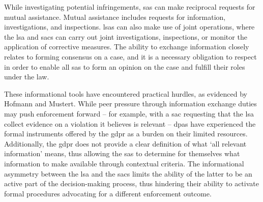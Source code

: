 While investigating potential infringements, \glspl{sa} can make reciprocal requests for mutual assistance.\autocite[60(2), 61(1)]{GDPR} 
Mutual assistance includes requests for information, investigations, and inspections.\autocite[61(1)]{GDPR}
\glspl{lsa} can also make use of joint operations, where the \gls{lsa} and \glspl{sac} can carry out joint investigations, inspections, or monitor the application of corrective measures.\autocite[60(2), 62]{GDPR}
The ability to exchange information closely relates to forming consensus on a case, and it is a necessary obligation to respect in order to enable all \glspl{sa} to form an opinion on the case and fulfill their roles under the law.\autocite[44--45]{edpbGuidelines022022}

These informational tools have encountered practical hurdles, as evidenced by Hofmann and Mustert.\autocite[465--467]{hofmannmustertScholtenHandbook2023}
While peer pressure through information exchange duties may push enforcement forward -- for example, with a \gls{sac} requesting that the \gls{lsa} collect evidence on a violation it believes is relevant -- \glspl{dpa} have experienced the formal instruments offered by the \gls{gdpr} as a burden on their limited resources.\autocite[466]{hofmannmustertScholtenHandbook2023}
Additionally, the \gls{gdpr} does not provide a clear definition of what `all relevant information' means, thus allowing the \glspl{sa} to determine for themselves what information to make available through contextual criteria.\autocite[466]{hofmannmustertScholtenHandbook2023}
The informational asymmetry between the \gls{lsa} and the \glspl{sac} limits the ability of the latter to be an active part of the decision-making process, thus hindering their ability to activate formal procedures advocating for a different enforcement outcome.\autocite[466--467]{hofmannmustertScholtenHandbook2023}

